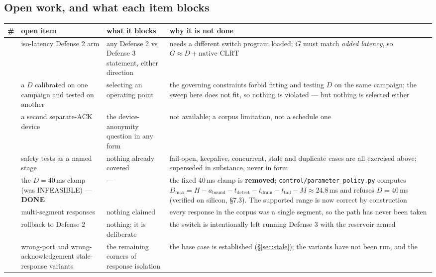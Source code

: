 \documentclass[10pt,a4paper,oneside]{article}
\newcommand{\num}[1]{\mbox{#1}}
\newcommand{\code}[1]{\texttt{\small #1}}
\begin{document}
\subsection{Open work, and what each item blocks}

{\small
\begin{longtable}{@{}>{\raggedright\arraybackslash}p{}>{\raggedright\arraybackslash}p{}>{\raggedright\arraybackslash}p{}>{\raggedright\arraybackslash}p{}@{}}
\toprule
\textbf{\#} & \textbf{open item} & \textbf{what it blocks} & \textbf{why it is not done} \\
\midrule
\endhead
1 & iso-latency Defense 2 arm & any Defense 2 vs Defense 3 statement, either direction
  & needs a different switch program loaded; $G$ must match \emph{added latency}, so
    $G\approx D+\text{native CLRT}$ \\
2 & a $D$ calibrated on one campaign and tested on another & selecting an operating point
  & the governing constraints forbid fitting and testing $D$ on the same campaign; the sweep
    here does not fit, so nothing is violated --- but nothing is selected either \\
3 & a second separate-ACK device & the device-anonymity question in any form
  & not available; a corpus limitation, not a schedule one \\
4 & safety tests as a named stage & nothing already covered
  & fail-open, keepalive, concurrent, stale and duplicate cases are all exercised above;
    superseded in substance, never in form \\
5 & the $D=40$\,ms clamp (was INFEASIBLE) --- \textbf{DONE}
  & ---
  & the fixed 40\,ms clamp is \textbf{removed}; \code{control/parameter\_policy.py} computes
    $D_{\max}=H-a_{\text{bound}}-t_{\text{detect}}-t_{\text{drain}}-t_{\text{tail}}-M\approx\num{24.8}$\,ms
    and refuses $D=40$\,ms (verified on silicon, \S7.3). The supported range is now correct by
    construction \\
6 & multi-segment responses & nothing claimed
  & every response in the corpus was a single segment, so the path has never been taken \\
7 & rollback to Defense 2 & nothing; it is deliberate
  & the switch is intentionally left running Defense 3 with the reservoir armed \\
11 & wrong-port and wrong-acknowledgement stale-response variants
  & the remaining corners of response isolation
  & the base case is established (\S\ref{sec:stale}); the variants have not been run, and the

\end{longtable}}
\end{document}
